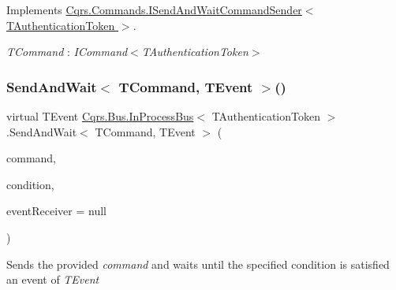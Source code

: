 Implements \hyperlink{interfaceCqrs_1_1Commands_1_1ISendAndWaitCommandSender_ada9643fbf8206bcc72cc5817f747ada8}{Cqrs.\+Commands.\+I\+Send\+And\+Wait\+Command\+Sender$<$ T\+Authentication\+Token $>$}.

\begin{Desc}
\item[Type Constraints]\begin{description}
\item[{\em T\+Command} : {\em I\+Command$<$T\+Authentication\+Token$>$}]\end{description}
\end{Desc}
\mbox{\label{classCqrs_1_1Bus_1_1InProcessBus_ac8c4a77edc761f15e16c638624424443}} 
\subsubsection{\texorpdfstring{Send\+And\+Wait$<$ T\+Command, T\+Event $>$()}{SendAndWait< TCommand, TEvent >()}\hspace{0.1cm}{\footnotesize\ttfamily [4/6]}}
{\footnotesize\ttfamily virtual T\+Event \hyperlink{classCqrs_1_1Bus_1_1InProcessBus}{Cqrs.\+Bus.\+In\+Process\+Bus}$<$ T\+Authentication\+Token $>$.Send\+And\+Wait$<$ T\+Command, T\+Event $>$ (\begin{DoxyParamCaption}\item[{T\+Command}]{command,  }\item[{Func$<$ I\+Enumerable$<$ \hyperlink{interfaceCqrs_1_1Events_1_1IEvent}{I\+Event}$<$ T\+Authentication\+Token $>$$>$, T\+Event $>$}]{condition,  }\item[{\hyperlink{interfaceCqrs_1_1Events_1_1IEventReceiver}{I\+Event\+Receiver}$<$ T\+Authentication\+Token $>$}]{event\+Receiver = {\ttfamily null} }\end{DoxyParamCaption})\hspace{0.3cm}{\ttfamily [virtual]}}



Sends the provided {\itshape command}  and waits until the specified condition is satisfied an event of {\itshape T\+Event}  



